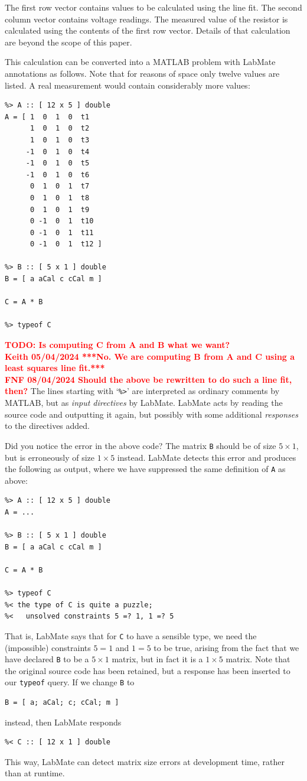 \documentclass{IMEKO2024}
\newcommand{\remph}{\emph}
\newcommand{\todo}[1]{\textcolor{red}{\textbf{TODO: #1}}}
\begin{document}
The first row vector contains values to be calculated using the line fit. The second column vector contains voltage readings. The measured value of the resistor is calculated using the contents of the first row vector. Details of that calculation are beyond the scope of this paper.

This calculation can be converted into a MATLAB problem with LabMate annotations as follows. Note that for reasons of space only twelve values are listed. A real measurement would contain considerably more values:
\begin{verbatim}
%> A :: [ 12 x 5 ] double
A = [ 1  0  1  0  t1
      1  0  1  0  t2
      1  0  1  0  t3
     -1  0  1  0  t4
     -1  0  1  0  t5
     -1  0  1  0  t6
      0  1  0  1  t7
      0  1  0  1  t8
      0  1  0  1  t9
      0 -1  0  1  t10
      0 -1  0  1  t11
      0 -1  0  1  t12 ]

%> B :: [ 5 x 1 ] double
B = [ a aCal c cCal m ]

C = A * B

%> typeof C
\end{verbatim}
%
\todo{Is computing C from A and B what we want? \\ Keith 05/04/2024 ***No. We are computing B from A and C using a least squares line fit.*** \\ FNF 08/04/2024 Should the above be rewritten to do such a line fit, then?}
The lines starting with `\texttt{\%>}' are interpreted as ordinary comments by MATLAB, but as \remph{input directives} by LabMate. LabMate acts by reading the source code and outputting it again, but possibly with some additional \remph{responses} to the directives added.

Did you notice the error in the above code? The matrix \texttt{B} should be of size $5 \times 1$, but is erroneously of size $1 \times 5$ instead. LabMate detects this error and produces the following as output, where we have suppressed the same definition of \texttt{A} as above:
\begin{verbatim}
%> A :: [ 12 x 5 ] double
A = ...

%> B :: [ 5 x 1 ] double
B = [ a aCal c cCal m ]

C = A * B

%> typeof C
%< the type of C is quite a puzzle;
%<   unsolved constraints 5 =? 1, 1 =? 5
\end{verbatim}
%
That is, LabMate says that for \texttt{C} to have a sensible type, we need the (impossible) constraints $5 = 1$ and $1 = 5$ to be true, arising from the fact that we have declared \texttt{B} to be a $5 \times 1$ matrix, but in fact it is a $1 \times 5$ matrix. Note that the original source code has been retained, but a response has been inserted to our \texttt{typeof} query. If we change \texttt{B} to
\begin{verbatim}
B = [ a; aCal; c; cCal; m ]
\end{verbatim}
instead, then LabMate responds
\begin{verbatim}
%< C :: [ 12 x 1 ] double
\end{verbatim}
This way, LabMate can detect matrix size errors at development time, rather than at runtime.
\end{document}
